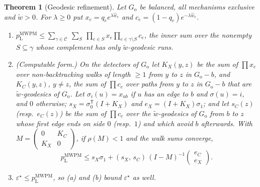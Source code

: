 \documentclass[11pt]{article}
\theoremstyle{plain}
\newtheorem{theorem}{Theorem}
\theoremstyle{definition}
\theoremstyle{remark}
\newcommand{\pM}{p_{\mathrm{L}}^{\mathrm{MWPM}}}
\newcommand{\err}{\varepsilon^{\star}}
\newcommand{\Go}{G_{\mathrm{o}}}
\newcommand{\cC}{\mathcal{C}}
\newcommand{\tw}{\tilde w}
\newcommand{\hw}{\hat w}
\renewcommand{\_}{\oldunderscore\allowbreak}
\begin{document}
\begin{theorem}[Geodesic refinement]\label{thm:geodesic}
Let $\Go$ be balanced, all mechanisms exclusive and $\tw>0$. For $\lambda\ge0$ put $x_e=q_ee^{\lambda\hw_e}$ and $c_e=(1-q_e)e^{-\lambda\hw_e}$.
\begin{enumerate}[label=(\alph*),leftmargin=*]
\item $\displaystyle\pM\le\sum_{\gamma\in\cC}\ \sum_{S}\ \prod_{e\in S}x_e\prod_{e\in\gamma\setminus S}c_e$, the inner sum over the nonempty $S\subseteq\gamma$ whose complement has only $\tw$-geodesic runs.
\item (Computable form.) On the detectors of $\Go$ let $K_X(y,z)$ be the sum of $\prod x_e$ over non-backtracking walks of length $\ge1$ from $y$ to $z$ in $\Go-b$, and $K_C(y,z)$, $y\ne z$, the sum of $\prod c_e$ over paths from $y$ to $z$ in $\Go-b$ that are $\tw$-geodesics of $\Go$. Let $\sigma_i(u)=x_{ub}$ if $u$ has an edge to $b$ and $\sigma(u)=i$, and $0$ otherwise; $s_X=\sigma_0^{\mathsf T}(I+K_X)$ and $e_X=(I+K_X)\sigma_1$; and let $s_C(z)$ (resp.\ $e_C(z)$) be the sum of $\prod c_e$ over the $\tw$-geodesics of $\Go$ from $b$ to $z$ whose first edge ends on side $0$ (resp.\ $1$) and which avoid $b$ afterwards. With $M=\begin{pmatrix}0&K_C\\K_X&0\end{pmatrix}$, if $\rho(M)<1$ and the walk sums converge,
\[
\pM\le s_X\sigma_1+(s_X,\,s_C)\,(I-M)^{-1}\begin{pmatrix}e_C\\ e_X\end{pmatrix}.
\]
\item $\err\le\pM$, so (a) and (b) bound $\err$ as well.
\end{enumerate}
\end{theorem}
\end{document}
